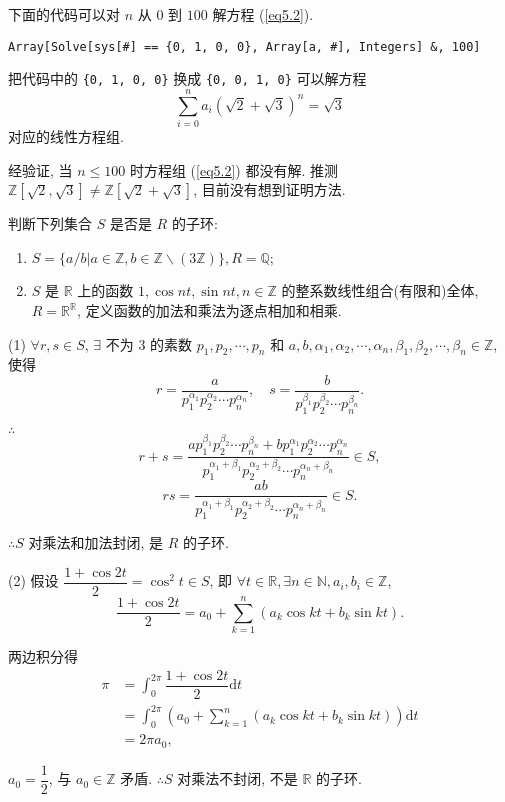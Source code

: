 \documentclass[color=black,device=normal,lang=cn,mode=geye]{elegantnote}
\begin{document}
\begin{solution}
    下面的代码可以对 $n$ 从 $0$ 到 $100$ 解方程 (\ref{eq5.2}).
    \begin{lstlisting}
Array[Solve[sys[#] == {0, 1, 0, 0}, Array[a, #], Integers] &, 100]\end{lstlisting}

    把代码中的 \verb|{0, 1, 0, 0}| 换成 \verb|{0, 0, 1, 0}| 可以解方程
    \[\sum\limits_{i=0}^na_i(\sqrt{2}+\sqrt{3})^n=\sqrt{3}\]
    对应的线性方程组.

    经验证, 当 $n\leq 100$ 时方程组 (\ref{eq5.2}) 都没有解. 推测 $\mathbb{Z}[\sqrt{2},\sqrt{3}]\neq\mathbb{Z}[\sqrt{2}+\sqrt{3}]$, 目前没有想到证明方法.
\end{solution}
\begin{exercisec}[5.3.4]
    判断下列集合 $S$ 是否是 $R$ 的子环:
    \begin{enumerate}
        \def\labelenumi{(\arabic{enumi})}
        \item $S=\{a/b|a\in\mathbb{Z},b\in\mathbb{Z}\backslash(3\mathbb{Z})\},R=\mathbb{Q}$;
        \item $S$ 是 $\mathbb{R}$ 上的函数 $1,\cos nt,\sin nt,n\in\mathbb{Z}$ 的整系数线性组合(有限和)全体, $R=\mathbb{R}^\mathbb{R}$, 定义函数的加法和乘法为逐点相加和相乘.
    \end{enumerate}
\end{exercisec}
\begin{solution}
    (1) $\forall r,s\in S$, $\exists$ 不为 $3$ 的素数 $p_1,p_2,\cdots,p_n$ 和 $a,b,\alpha_1,\alpha_2,\cdots,\alpha_n,\beta_1,\beta_2,\cdots,\beta_n\in\mathbb{Z}$, 使得
    \[r=\dfrac{a}{p_1^{\alpha_1}p_2^{\alpha_2}\cdots p_n^{\alpha_n}},\quad s=\dfrac{b}{p_1^{\beta_1}p_2^{\beta_2}\cdots p_n^{\beta_n}}.\]

    $\therefore$
    \[r+s=\dfrac{ap_1^{\beta_1}p_2^{\beta_2}\cdots p_n^{\beta_n}+bp_1^{\alpha_1}p_2^{\alpha_2}\cdots p_n^{\alpha_n}}{p_1^{\alpha_1+\beta_1}p_2^{\alpha_2+\beta_2}\cdots p_n^{\alpha_n+\beta_n}}\in S,\]
    \[rs=\dfrac{ab}{p_1^{\alpha_1+\beta_1}p_2^{\alpha_2+\beta_2}\cdots p_n^{\alpha_n+\beta_n}}\in S.\]

    $\therefore S$ 对乘法和加法封闭, 是 $R$ 的子环.

    (2) 假设 $\dfrac{1+\cos2t}{2}=\cos^2t\in S$, 即 $\forall t\in\mathbb{R},\exists n\in\mathbb{N},a_i,b_i\in\mathbb{Z}$,
    \[\dfrac{1+\cos2t}{2}=a_0+\sum\limits_{k=1}^n(a_k\cos kt+b_k\sin kt).\]

    两边积分得
    \begin{align*}
        \pi & =\int_0^{2\pi}\dfrac{1+\cos2t}{2}\mathrm{d}t \\
        & =\int_0^{2\pi}\left(a_0+\sum\limits_{k=1}^n(a_k\cos kt+b_k\sin kt)\right)\mathrm{d}t \\
        & =2\pi a_0,
    \end{align*}

    $a_0=\dfrac{1}{2}$, 与 $a_0\in\mathbb{Z}$ 矛盾. $\therefore S$ 对乘法不封闭, 不是 $\mathbb{R}$ 的子环.
\end{solution}
\end{document}
